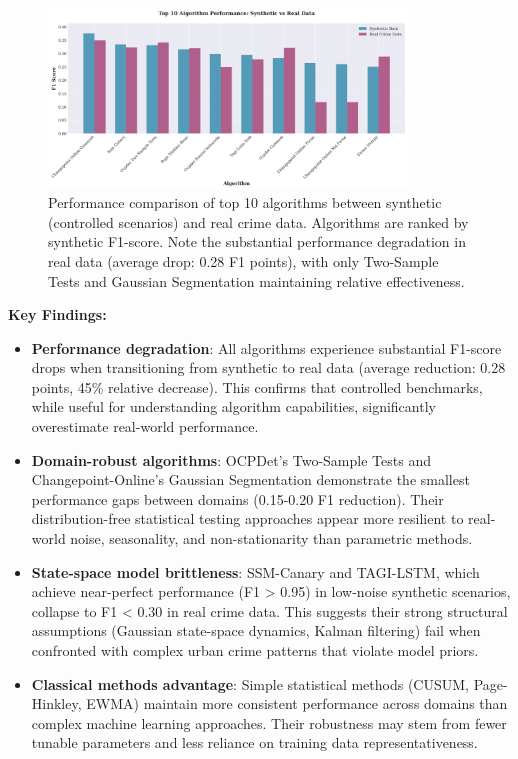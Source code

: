 \documentclass[journal,article,submit,pdftex,moreauthors]{Definitions/mdpi}
\begin{document}
\begin{figure}[H]
\centering
\includegraphics[width=0.85\textwidth]{figures/fig_top_algorithms_comparison.png}
\caption{Performance comparison of top 10 algorithms between synthetic (controlled scenarios) and real crime data. Algorithms are ranked by synthetic F1-score. Note the substantial performance degradation in real data (average drop: 0.28 F1 points), with only Two-Sample Tests and Gaussian Segmentation maintaining relative effectiveness.}
\label{fig:top_algorithms_comparison}
\end{figure}

\textbf{Key Findings:}

\begin{itemize}
    \item \textbf{Performance degradation}: All algorithms experience substantial F1-score drops when transitioning from synthetic to real data (average reduction: 0.28 points, 45\% relative decrease). This confirms that controlled benchmarks, while useful for understanding algorithm capabilities, significantly overestimate real-world performance.
    
    \item \textbf{Domain-robust algorithms}: OCPDet's Two-Sample Tests and Changepoint-Online's Gaussian Segmentation demonstrate the smallest performance gaps between domains (0.15-0.20 F1 reduction). Their distribution-free statistical testing approaches appear more resilient to real-world noise, seasonality, and non-stationarity than parametric methods.
    
    \item \textbf{State-space model brittleness}: SSM-Canary and TAGI-LSTM, which achieve near-perfect performance (F1 > 0.95) in low-noise synthetic scenarios, collapse to F1 < 0.30 in real crime data. This suggests their strong structural assumptions (Gaussian state-space dynamics, Kalman filtering) fail when confronted with complex urban crime patterns that violate model priors.
    
    \item \textbf{Classical methods advantage}: Simple statistical methods (CUSUM, Page-Hinkley, EWMA) maintain more consistent performance across domains than complex machine learning approaches. Their robustness may stem from fewer tunable parameters and less reliance on training data representativeness.
\end{itemize}
\end{document}
